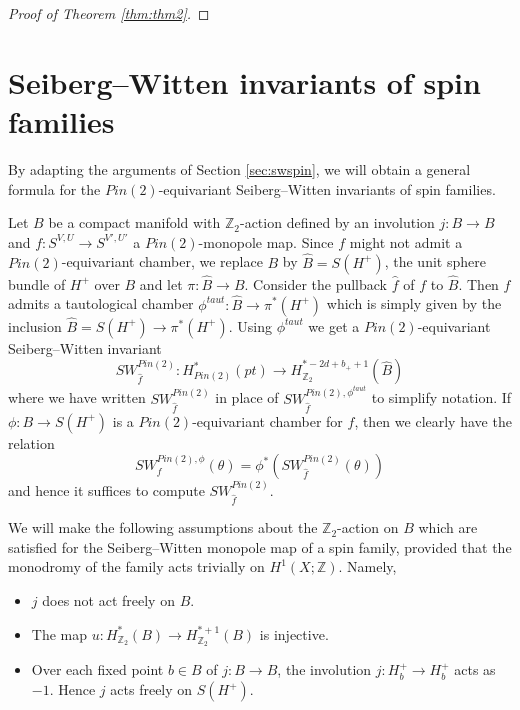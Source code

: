 \documentclass{amsart}
\theoremstyle{definition}
\theoremstyle{remark}
\numberwithin{equation}{section}
\begin{document}
\begin{proof}[Proof of Theorem \ref{thm:thm2}]
\end{proof}



\section{Seiberg--Witten invariants of spin families}\label{sec:swfam}

By adapting the arguments of Section \ref{sec:swspin}, we will obtain a general formula for the $Pin(2)$-equivariant Seiberg--Witten invariants of spin families.

Let $B$ be a compact manifold with $\mathbb{Z}_2$-action defined by an involution $j : B \to B$ and $f : S^{V,U} \to S^{V',U'}$ a $Pin(2)$-monopole map. Since $f$ might not admit a $Pin(2)$-equivariant chamber, we replace $B$ by $\widehat{B} = S(H^+)$, the unit sphere bundle of $H^+$ over $B$ and let $\pi : \widehat{B} \to B$. Consider the pullback $\widehat{f}$ of $f$ to $\widehat{B}$. Then $\widehat{f}$ admits a tautological chamber $\phi^{taut} : \widehat{B} \to \pi^*(H^+)$ which is simply given by the inclusion $\widehat{B} = S(H^+) \to \pi^*(H^+)$. Using $\phi^{taut}$ we get a $Pin(2)$-equivariant Seiberg--Witten invariant
\[
SW_{\widehat{f}}^{Pin(2)} : H^*_{Pin(2)}(pt) \to H^{*-2d+b_+ + 1}_{\mathbb{Z}_2}(\widehat{B})
\]
where we have written $SW_{\widehat{f}}^{Pin(2)}$ in place of $SW_{\widehat{f}}^{Pin(2),\phi^{taut}}$ to simplify notation. If $\phi : B \to S(H^+)$ is a $Pin(2)$-equivariant chamber for $f$, then we clearly have the relation
\[
SW_f^{Pin(2),\phi}(\theta) = \phi^*( SW^{Pin(2)}_{\widehat{f}}(\theta))
\]
and hence it suffices to compute $SW^{Pin(2)}_{\widehat{f}}$.


We will make the following assumptions about the $\mathbb{Z}_2$-action on $B$ which are satisfied for the Seiberg--Witten monopole map of a spin family, provided that the monodromy of the family acts trivially on $H^1(X ; \mathbb{Z})$. Namely,
\begin{itemize}
\item[(1)]{$j$ does not act freely on $B$.}
\item[(2)]{The map $u : H^*_{\mathbb{Z}_2}(B) \to H^{*+1}_{\mathbb{Z}_2}(B)$ is injective.}
\item[(3)]{Over each fixed point $b \in B$ of $j : B \to B$, the involution $j : H^+_b \to H^+_b$ acts as $-1$. Hence $j$ acts freely on $S(H^+)$.}
\end{itemize}
\end{document}

